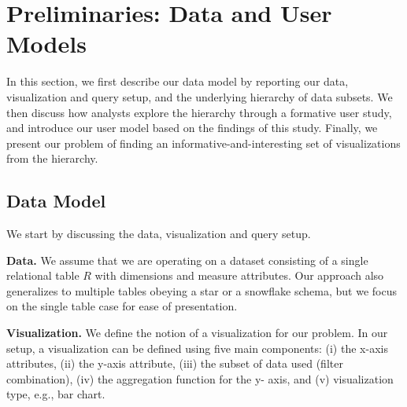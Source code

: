 \section{Preliminaries: Data and User Models} 

In this section, we first describe our data model by reporting our data, visualization and query setup, and the underlying hierarchy of data subsets. We then discuss how analysts explore the hierarchy through a formative user study, and introduce our user model based on the findings of this study. Finally, we present our problem of finding an informative-and-interesting set of visualizations from the hierarchy.


\subsection{Data Model}
We start by discussing the data, visualization and query setup.

\textbf{Data.} We assume that we are operating on a dataset consisting of a single relational table $R$ with dimensions and measure attributes. Our approach also generalizes to multiple tables obeying a star or a snowflake schema, but we focus on the single table case for ease of presentation.


\textbf{Visualization.} We define the notion of a visualization for our problem. In our setup, a visualization can be defined using five main components: (i) the x-axis attributes, (ii) the y-axis attribute, (iii) the subset of data used (filter combination), (iv) the aggregation function for the y- axis, and (v) visualization type, e.g., bar chart.

